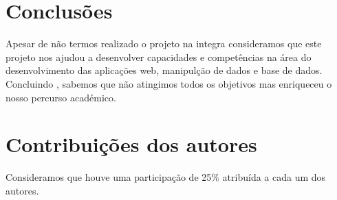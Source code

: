 \documentclass{report}
\begin{document}
\chapter{Conclusões}
\label{chap.6}
\par 
Apesar de não termos realizado o projeto na integra consideramos que este projeto nos ajudou a desenvolver capacidades e competências na área do desenvolvimento das aplicações web, manipulção de dados e base de dados.
Concluindo , sabemos que não atingimos todos os objetivos mas enriqueceu o nosso percurso académico.
\chapter*{Contribuições dos autores}
\par Consideramos que houve uma participação de 25\% atribuída a cada um dos autores. 
\end{document}
